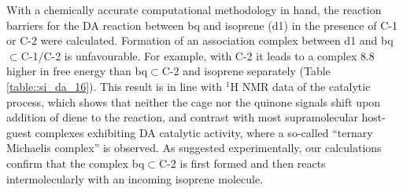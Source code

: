 \documentclass[../../main.tex]{subfiles}
\begin{document}
With a chemically accurate computational methodology in hand, the reaction barriers for the DA reaction between bq and isoprene (d1) in the presence of C-1 or C-2 were calculated. Formation of an association complex between d1 and bq$\subset$C-1/C-2 is unfavourable. For example, with C-2 it leads to a complex 8.8 \kcalx higher in free energy than bq$\subset$C-2 and isoprene separately (Table \ref{table::si_da_16}). This result is in line with ${}^1$H NMR data of the catalytic process, which shows that neither the cage nor the quinone signals shift upon addition of diene to the reaction,\cite{MartCentelles2018} and contrast with most supramolecular host-guest complexes exhibiting DA catalytic activity, where a so-called “ternary Michaelis complex” is observed.\cite{Daver2017} As suggested experimentally, our calculations confirm that the complex bq$\subset$C-2 is first formed and then reacts intermolecularly with an incoming isoprene molecule. 
\end{document}
